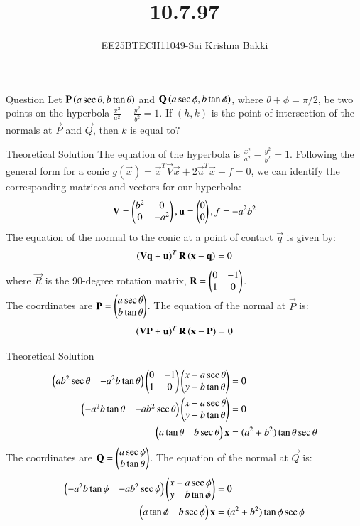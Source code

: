 \documentclass{beamer}
\title %
{10.7.97}
\author 
{EE25BTECH11049-Sai Krishna Bakki}
\begin{document}
\frame{\titlepage}
\begin{frame}{Question}
Let $\mathbf{P}\left(a \sec \theta, b \tan \theta\right)$ and $\mathbf{Q}\left(a \sec \phi, b \tan \phi\right)$, where $\theta + \phi = \pi/2$, be two points on the hyperbola $\frac{x^2}{a^2} - \frac{y^2}{b^2} = 1$. If $(h, k)$ is the point of intersection of the normals at $\vec{P}$ and $\vec{Q}$, then $k$ is equal to?
\end{frame}
\begin{frame}{Theoretical Solution}
    The equation of the hyperbola is $\frac{x^2}{a^2} - \frac{y^2}{b^2} = 1$. Following the general form for a conic $g(\vec{x}) = \vec{x}^T \vec{V} \vec{x} + 2\vec{u}^T \vec{x} + f = 0$, we can identify the corresponding matrices and vectors for our hyperbola:
\begin{align}
     \mathbf{V} = \begin{pmatrix}b^2 & 0 \\ 0 & -a^2\end{pmatrix}, 
     \mathbf{u} = \begin{pmatrix}0 \\ 0\end{pmatrix}, 
     f = -a^2b^2
\end{align}
The equation of the normal to the conic at a point of contact $\vec{q}$ is given by:
\begin{align}
 \left(\mathbf{V}\mathbf{q} + \mathbf{u}\right)^T \mathbf{R} \left(\mathbf{x} - \mathbf{q}\right) = 0 
 \end{align}
where $\vec{R}$ is the 90-degree rotation matrix, $\mathbf{R} = \begin{pmatrix}0 & -1 \\ 1 & 0\end{pmatrix}$.\\
The coordinates are $\mathbf{P} = \begin{pmatrix} a \sec \theta \\ b \tan \theta \end{pmatrix}$.
The equation of the normal at $\vec{P}$ is:
\begin{align}
   \left(\mathbf{V}\mathbf{P} + \mathbf{u}\right)^T \mathbf{R} \left(\mathbf{x} - \mathbf{P}\right) = 0 
\end{align}
\end{frame}
\begin{frame}{Theoretical Solution}
\begin{align}
    \begin{pmatrix} ab^2 \sec \theta & -a^2b \tan \theta \end{pmatrix} \begin{pmatrix} 0 & -1 \\ 1 & 0 \end{pmatrix} \begin{pmatrix} x - a \sec \theta \\ y - b \tan \theta \end{pmatrix} &= 0 \\
    \begin{pmatrix} -a^2b \tan \theta & -ab^2 \sec \theta \end{pmatrix} \begin{pmatrix} x - a \sec \theta \\ y - b \tan \theta \end{pmatrix} &= 0\\
    \begin{pmatrix}a\tan\theta&b\sec\theta\end{pmatrix}\mathbf{x}&=(a^2 + b^2) \tan \theta \sec \theta
\end{align}
The coordinates are $\mathbf{Q} = \begin{pmatrix} a \sec \phi \\ b \tan \theta \end{pmatrix}$.
The equation of the normal at $\vec{Q}$ is:
\begin{align}
    \begin{pmatrix} -a^2b \tan \phi & -ab^2 \sec \phi \end{pmatrix} \begin{pmatrix} x - a \sec \phi \\ y - b \tan \phi \end{pmatrix} &= 0\\
    \begin{pmatrix}a\tan\phi&b\sec\phi\end{pmatrix}\mathbf{x}&=(a^2 + b^2) \tan \phi \sec \phi
\end{align}
\end{frame}
\end{document}
